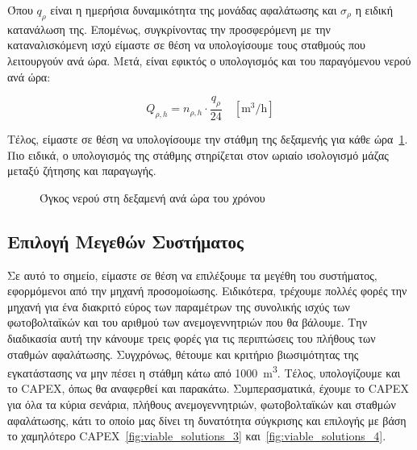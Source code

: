 Όπου \(q_{\rho}\) είναι η ημερήσια δυναμικότητα της μονάδας αφαλάτωσης και
\(\sigma_{\rho}\) η ειδική κατανάλωση της. Επομένως, συγκρίνοντας την
προσφερόμενη με την καταναλισκόμενη ισχύ είμαστε σε θέση να υπολογίσουμε τους
σταθμούς που λειτουργούν ανά ώρα. Μετά, είναι εφικτός ο υπολογισμός και του
παραγόμενου νερού ανά ώρα:

\begin{equation}\label{eq:hourly_desalination_production}
	Q_{\rho , h}=n_{\rho ,h}\cdot \frac{q_{\rho}}{24}\quad \left[\si{\cubic\meter\per\hour}\right]
\end{equation}

Τέλος, είμαστε σε θέση να υπολογίσουμε την στάθμη της δεξαμενής για κάθε ώρα~\ref{fig:tank_level}.
Πιο ειδικά, ο υπολογισμός της στάθμης στηρίζεται στον ωριαίο ισολογισμό μάζας
μεταξύ ζήτησης και παραγωγής.

\begin{figure}[ht]
	\centering
	\caption{Όγκος νερού στη δεξαμενή ανά ώρα του χρόνου}\label{fig:tank_level}
\end{figure}

\subsection{Επιλογή Μεγεθών Συστήματος}

Σε αυτό το σημείο, είμαστε σε θέση να επιλέξουμε τα μεγέθη του συστήματος,
εφορμόμενοι από την μηχανή προσομοίωσης. Ειδικότερα, τρέχουμε πολλές φορές την
μηχανή για ένα διακριτό εύρος των παραμέτρων της συνολικής ισχύς των
φωτοβολταϊκών και του αριθμού των ανεμογεννητριών που θα βάλουμε. Την
διαδικασία αυτή την κάνουμε τρεις φορές για τις περιπτώσεις του πλήθους των
σταθμών αφαλάτωσης. Συγχρόνως, θέτουμε και κριτήριο βιωσιμότητας της
εγκατάστασης να μην πέσει η στάθμη κάτω από \qty{1000}{\cubic\meter}. Τέλος,
υπολογίζουμε και το CAPEX, όπως θα αναφερθεί και παρακάτω. Συμπερασματικά,
έχουμε το CAPEX για όλα τα κύρια σενάρια, πλήθους ανεμογεννητριών,
φωτοβολταϊκών και σταθμών αφαλάτωσης, κάτι το οποίο μας δίνει τη δυνατότητα
σύγκρισης και επιλογής με βάση το χαμηλότερο CAPEX~\ref{fig:viable_solutions_3}
και~\ref{fig:viable_solutions_4}.

